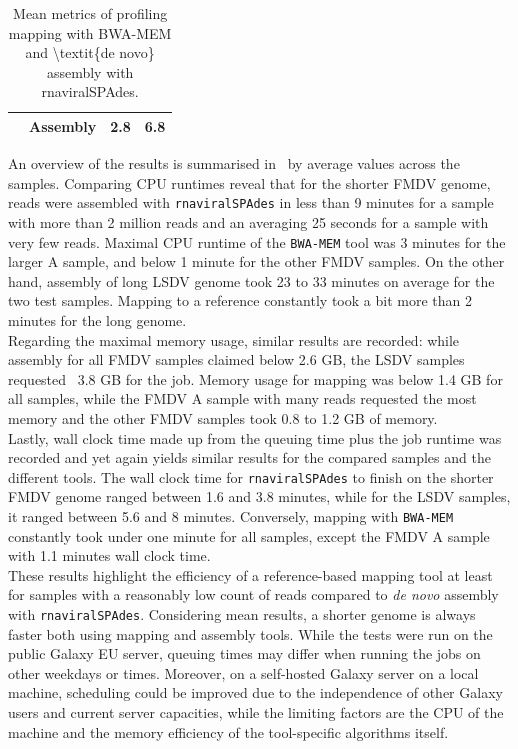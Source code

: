 \begin{table}[ht!]
\begin{tabular}{lccc}
                                                                                                   & Assembly             & 2.8                                                                                               & 6.8                                                                                               \\ \hline
    \end{tabular}
    \caption{Mean metrics of profiling mapping with BWA-MEM and \textbackslash{}textit\{de novo\} assembly with rnaviralSPAdes.}
\label{tab:4-profiling-mean}
\end{table}
An overview of the results is summarised in~ by average values across the samples. Comparing CPU runtimes reveal that for the shorter \ac{FMDV} genome, reads were assembled with \texttt{rnaviralSPAdes} in less than 9 minutes for a sample with more than 2 million reads and an averaging 25 seconds for a sample with very few reads. Maximal CPU runtime of the \texttt{BWA-MEM} tool was 3 minutes for the larger A sample, and below 1 minute for the other \ac{FMDV} samples. On the other hand, assembly of long \ac{LSDV} genome took 23 to 33 minutes on average for the two test samples. Mapping to a reference constantly took a bit more than 2 minutes for the long genome.\\
Regarding the maximal memory usage, similar results are recorded: while assembly for all \ac{FMDV} samples claimed below 2.6 GB, the \ac{LSDV} samples requested ~3.8 GB for the job. Memory usage for mapping was below 1.4 GB for all samples, while the \ac{FMDV} A sample with many reads requested the most memory and the other \ac{FMDV} samples took 0.8 to 1.2 GB of memory.\\
Lastly, wall clock time made up from the queuing time plus the job runtime was recorded and yet again yields similar results for the compared samples and the different tools. The wall clock time for \texttt{rnaviralSPAdes} to finish on the shorter \ac{FMDV} genome ranged between 1.6 and 3.8 minutes, while for the \ac{LSDV} samples, it ranged between 5.6 and 8 minutes. Conversely, mapping with \texttt{BWA-MEM} constantly took under one minute for all samples, except the \ac{FMDV} A sample with 1.1 minutes wall clock time. \\
These results highlight the efficiency of a reference-based mapping tool at least for samples with a reasonably low count of reads compared to \textit{de novo} assembly with \texttt{rnaviralSPAdes}. Considering mean results, a shorter genome is always faster both using mapping and assembly tools. While the tests were run on the public Galaxy EU server, queuing times may differ when running the jobs on other weekdays or times. Moreover, on a self-hosted Galaxy server on a local machine, scheduling could be improved due to the independence of other Galaxy users and current server capacities, while the limiting factors are the CPU of the machine and the memory efficiency of the tool-specific algorithms itself.
